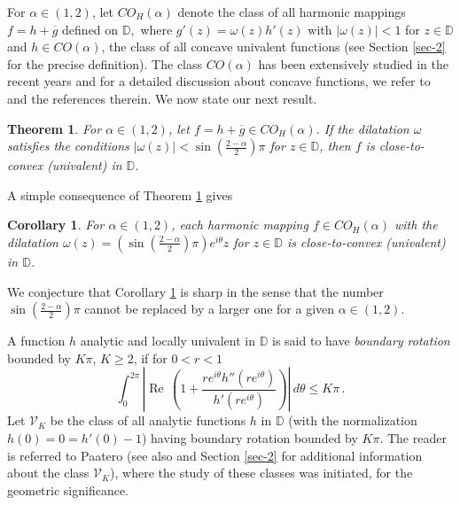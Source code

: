 \documentclass[a4paper,12pt]{amsart}
\newtheorem{thm}{Theorem}
\newtheorem{cor}{Corollary}
\theoremstyle{definition}
\begin{document}
For $\alpha \in (1,2)$, let $ CO_{H}(\alpha)$ denote the class of all
harmonic mappings $f=h+\overline{g}$ defined on ${{\mathbb D}},$ where
$ g'(z)= \omega (z)h'(z)$ with $|\omega (z)|<1$ for $z\in {{\mathbb D}}$ and
$h\in CO(\alpha )$, the class of all concave univalent functions (see Section \ref{sec-2} for the precise
definition).
The class $ CO(\alpha )$ has been extensively studied in the recent years and for a detailed discussion
about concave functions, we refer to \cite{Avk-Wir-06, Avk-Wir-05, BPW-09, Pom-Cruz} and the references
therein. We now state our next result.

\begin{thm}\label{AP-Theorem3}
For $\alpha \in (1,2)$, let $f=h+\overline{g}\in CO_{H}(\alpha)$. If the dilatation $\omega $ satisfies the conditions
$|\omega (z)|< \sin (\frac{2-\alpha }{2})\pi$ for $z\in{{\mathbb D}}$, then $f$ is close-to-convex (univalent) in ${{\mathbb D}}$.
\end{thm}

A simple consequence of Theorem \ref{AP-Theorem3} gives

\begin{cor}\label{AP-Cor3}
For $\alpha \in (1,2)$, each harmonic mapping $f\in CO_{H}(\alpha)$ with the dilatation
$\omega (z)=\left( \sin (\frac{2-\alpha }{2})\pi \right) e^{i\theta}z$ for $z\in{{\mathbb D}}$ is close-to-convex (univalent) in ${{\mathbb D}}$.
\end{cor}

We conjecture that Corollary \ref{AP-Cor3} is sharp in the sense that the number $ \sin (\frac{2-\alpha }{2})\pi$
cannot be replaced by a larger one for a given $\alpha \in (1,2)$.

A function $h$ analytic and locally univalent in ${{\mathbb D}}$
is said to have {\it boundary rotation} bounded by $K\pi$, $K\ge 2$, if for $0<r<1$
\begin{equation}\label{sec2-eq1}
\int_0^{2\pi}\left|{{\operatorname{Re}\,}} \left (1+\frac{re^{i\theta}h''(re^{i\theta})}{h'(re^{i\theta})}
\right )\right|\,d\theta \le K\pi\,.
\end{equation}
Let ${\mathcal V}_K$ be the class of all analytic functions $h$ in ${{\mathbb D}}$ (with the normalization
$h(0)=0=h'(0)-1$) having boundary rotation bounded by $K\pi$.
The reader is referred to Paatero \cite{Paa1} (see also \cite{Dur,Koepf-89} and Section \ref{sec-2} for additional information
about the class ${\mathcal V}_K$), where the study of these classes was initiated, for the geometric significance.
\end{document}
